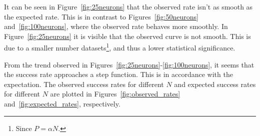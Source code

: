 It can be seen in Figure~\ref{fig:25neurons} that the observed rate isn't as smooth as the expected rate.
This is in contrast to Figures~\ref{fig:50neurons} and~\ref{fig:100neurons}, where the observed rate behaves more smoothly.
In Figure~\ref{fig:25neurons} it is visible that the observed curve is not smooth. This is due to a smaller number datasets\footnote{Since \(P = \alpha N\).}, and thus a lower statistical significance.

From the trend observed in Figures~\ref{fig:25neurons}-\ref{fig:100neurons}, it seems that the success rate approaches a step function.
This is in accordance with the expectation.
The observed success rates for different \(N\) and expected success rates for different \(N\) are plotted in Figures~\ref{fig:observed_rates} and~\ref{fig:expected_rates}, respectively.


